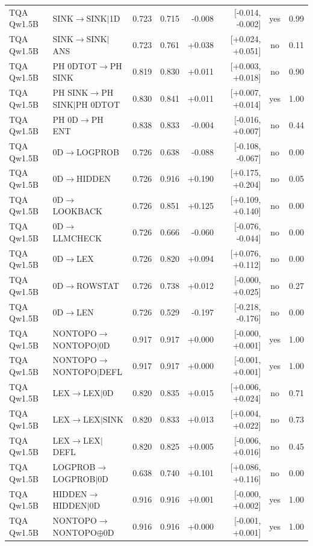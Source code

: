 \begin{longtable}{llrrrrcc}
TQA Qw1.5B & SINK$\to$SINK$\mid$1D & 0.723 & 0.715 & -0.008 & [-0.014, -0.002] & yes & 0.99 \\
TQA Qw1.5B & SINK$\to$SINK$\mid$ANS & 0.723 & 0.761 & +0.038 & [+0.024, +0.051] & no & 0.11 \\
TQA Qw1.5B & PH 0DTOT$\to$PH SINK & 0.819 & 0.830 & +0.011 & [+0.003, +0.018] & no & 0.90 \\
TQA Qw1.5B & PH SINK$\to$PH SINK$\mid$PH 0DTOT & 0.830 & 0.841 & +0.011 & [+0.007, +0.014] & yes & 1.00 \\
TQA Qw1.5B & PH 0D$\to$PH ENT & 0.838 & 0.833 & -0.004 & [-0.016, +0.007] & no & 0.44 \\
TQA Qw1.5B & 0D$\to$LOGPROB & 0.726 & 0.638 & -0.088 & [-0.108, -0.067] & no & 0.00 \\
TQA Qw1.5B & 0D$\to$HIDDEN & 0.726 & 0.916 & +0.190 & [+0.175, +0.204] & no & 0.05 \\
TQA Qw1.5B & 0D$\to$LOOKBACK & 0.726 & 0.851 & +0.125 & [+0.109, +0.140] & no & 0.00 \\
TQA Qw1.5B & 0D$\to$LLMCHECK & 0.726 & 0.666 & -0.060 & [-0.076, -0.044] & no & 0.00 \\
TQA Qw1.5B & 0D$\to$LEX & 0.726 & 0.820 & +0.094 & [+0.076, +0.112] & no & 0.00 \\
TQA Qw1.5B & 0D$\to$ROWSTAT & 0.726 & 0.738 & +0.012 & [-0.000, +0.025] & no & 0.27 \\
TQA Qw1.5B & 0D$\to$LEN & 0.726 & 0.529 & -0.197 & [-0.218, -0.176] & no & 0.00 \\
TQA Qw1.5B & NONTOPO$\to$NONTOPO$\mid$0D & 0.917 & 0.917 & +0.000 & [-0.000, +0.001] & yes & 1.00 \\
TQA Qw1.5B & NONTOPO$\to$NONTOPO$\mid$DEFL & 0.917 & 0.917 & +0.000 & [-0.001, +0.001] & yes & 1.00 \\
TQA Qw1.5B & LEX$\to$LEX$\mid$0D & 0.820 & 0.835 & +0.015 & [+0.006, +0.024] & no & 0.71 \\
TQA Qw1.5B & LEX$\to$LEX$\mid$SINK & 0.820 & 0.833 & +0.013 & [+0.004, +0.022] & no & 0.73 \\
TQA Qw1.5B & LEX$\to$LEX$\mid$DEFL & 0.820 & 0.825 & +0.005 & [-0.006, +0.016] & no & 0.45 \\
TQA Qw1.5B & LOGPROB$\to$LOGPROB$\mid$0D & 0.638 & 0.740 & +0.101 & [+0.086, +0.116] & no & 0.00 \\
TQA Qw1.5B & HIDDEN$\to$HIDDEN$\mid$0D & 0.916 & 0.916 & +0.001 & [-0.000, +0.002] & yes & 1.00 \\
TQA Qw1.5B & NONTOPO$\to$NONTOPO$\oplus$0D & 0.916 & 0.916 & +0.000 & [-0.001, +0.001] & yes & 1.00 \\

\end{longtable}
